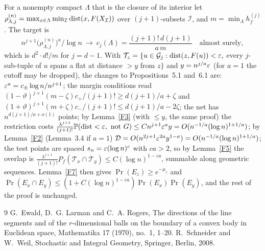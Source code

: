 \documentclass[11pt]{article}
\begin{document}
For a nonempty compact $\Lambda$ that is the closure of its interior let
$\rho^{(n)}_{\Lambda,j}=\max_{x\in\Lambda}\min_{\mathcal I}\operatorname{dist}(x,F(X_{\mathcal I}))$ over $(j+1)$-subsets $\mathcal I$, and $m=\min_\Lambda h^{(j)}_f$. The target is
\[
  n^{j+1}\bigl(\rho^{(n)}_{\Lambda,j}\bigr)^a/\log n\ \to\ c_j(\Lambda)=\frac{(j+1)!\,d(j+1)}{a\,m}\quad\text{almost surely},
\]
which is $d^2\cdot d!/m$ for $j=d-1$. With $\mathcal T_z=\{u\in\mathcal G_j:\operatorname{dist}(z,F(u))<\varepsilon,$ every $j$-sub-tuple of $u$ spans a flat
at distance $>y$ from $z\}$ and $y=n^{j/a}\varepsilon$ (for $a=1$ the cutoff may be dropped), the changes to Propositions~5.1 and~6.1 are:
$\varepsilon^a=c_\pm\log n/n^{j+1}$; the margin conditions read $(1-\vartheta)^{j+1}(m-\zeta)c_+/(j+1)!\ge d(j+1)/a+\zeta$ and
$(1+\vartheta)^{j+1}(m+\zeta)c_-/(j+1)!\le d(j+1)/a-2\zeta$; the net has $n^{d(j+1)/a+o(1)}$ points; by Lemma~\ref{F3} (with $\le y$, the
same proof) the restriction costs $\frac{\lambda^{j+1}}{(j+1)!}\mathbb{P}(\operatorname{dist}<\varepsilon,\text{ not }G)\le Cn^{j+1}\varepsilon^ay=O(n^{-1/a}(\log n)^{1+1/a})$; by
Lemma~\ref{F2} (Lemma~3.4 if $a=1$) $\mathcal D=O(n^{2j+1}\varepsilon^{2a}y^{1-a})=O(n^{-1/a}(\log n)^{1+1/a})$; the test points are spaced
$s_n=\varepsilon(\log n)^c$ with $ca>2$, so by Lemma~\ref{F5} the overlap is $\frac{\lambda^{j+1}}{(j+1)!}P_f(\mathcal T_x\cap\mathcal T_y)\le C(\log n)^{1-ca}$,
summable along geometric sequences. Lemma~\ref{F7} then gives $\Pr(E_z)\ge e^{-\mu_z}$ and
$\Pr(E_x\cap E_y)\le(1+C(\log n)^{1-ca})\Pr(E_x)\Pr(E_y)$, and the rest of the proof is unchanged.

\begin{thebibliography}{9}
 G.~Ewald, D.~G. Larman and C.~A. Rogers, The directions of the line segments and of the $r$-dimensional balls on
the boundary of a convex body in Euclidean space, Mathematika 17 (1970), no.~1, 1--20.
 R.~Schneider and W.~Weil, Stochastic and Integral Geometry, Springer, Berlin, 2008.
\end{thebibliography}
\end{document}
